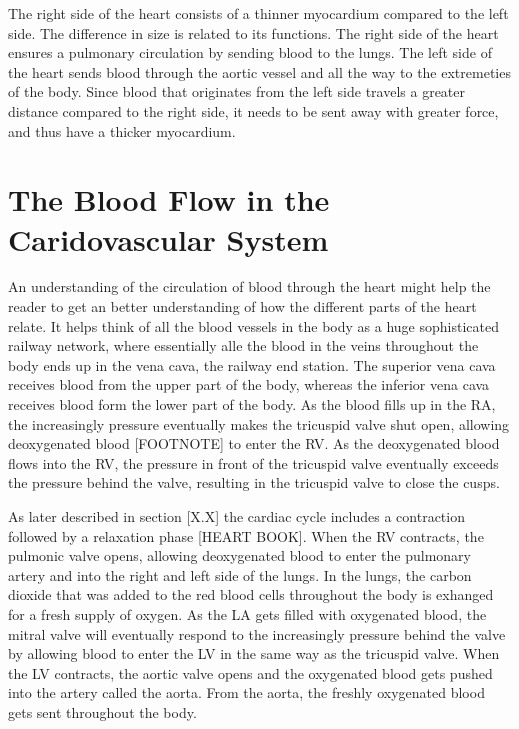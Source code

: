 The right side of the heart consists of a thinner myocardium compared to the left side. The difference in size is related to its functions. The right side of the heart ensures a pulmonary circulation by sending blood to the lungs. The left side of the heart sends blood through the aortic vessel and all the way to the extremeties of the body. Since blood that originates from the left side travels a greater distance compared to the right side, it needs to be sent away with greater force, and thus have a thicker myocardium.




\section{The Blood Flow in the Caridovascular System}
An understanding of the circulation of blood through the heart might help the reader to get an better understanding of how the different parts of the heart relate. It helps think of all the blood vessels in the body as a huge sophisticated railway network, where essentially alle the blood in the veins throughout the body ends up in the vena cava, the railway end station. The superior vena cava receives blood from the upper part of the body, whereas the inferior vena cava receives blood form the lower part of the body. As the blood fills up in the RA, the increasingly pressure eventually makes the tricuspid valve shut open, allowing deoxygenated blood [FOOTNOTE] to enter the RV. As the deoxygenated blood flows into the RV, the pressure in front of the tricuspid valve eventually exceeds the pressure behind the valve, resulting in the tricuspid valve to close the cusps. 

As later described in section [X.X] the cardiac cycle includes a contraction followed by a relaxation phase [HEART BOOK]. When the RV contracts, the pulmonic valve opens, allowing deoxygenated blood to enter the pulmonary artery and into the right and left side of the lungs. In the lungs, the carbon dioxide that was added to the red blood cells throughout the body is exhanged for a fresh supply of oxygen.
As the LA gets filled with oxygenated blood, the mitral valve will eventually respond to the increasingly pressure behind the valve by allowing blood to enter the LV in the same way as the tricuspid valve. When the LV contracts, the aortic valve opens and the oxygenated blood gets pushed into the artery called the aorta. From the aorta, the freshly oxygenated blood gets sent throughout the body.

